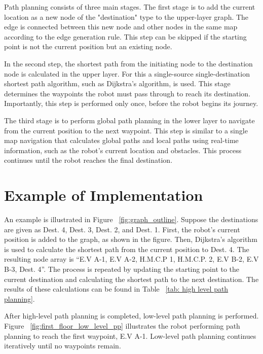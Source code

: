 \documentclass[en]{snu-cse-bsc-thesis}
\begin{document}
Path planning consists of three main stages. 
The first stage is to add the current location as a new node of the "destination" type to the upper-layer graph. 
The edge is connected between this new node and other nodes in the same map according to the edge generation rule.
This step can be skipped if the starting point is not the current position but an existing node.

In the second step, the shortest path from the initiating node to the destination node is calculated in the upper layer.
For this a single-source single-destination shortest path algorithm, such as Dijkstra’s algorithm, is used.
This stage determines the waypoints the robot must pass through to reach its destination. 
Importantly, this step is performed only once, before the robot begins its journey.

The third stage is to perform global path planning in the lower layer to navigate from the current position to the next waypoint. 
This step is similar to a single map navigation that calculates global paths and local paths using real-time information, such as the robot's current location and obstacles. 
This process continues until the robot reaches the final destination.

\section{Example of Implementation}\label{sec:Example}
An example is illustrated in Figure ~\ref{fig:graph_outline}. Suppose the destinations are given as Dest. 4, Dest. 3, Dest. 2, and Dest. 1. First, the robot's current position is added to the graph, as shown in the figure. Then, Dijkstra’s algorithm is used to calculate the shortest path from the current position to Dest. 4. The resulting node array is “E.V A-1, E.V A-2, H.M.C.P 1, H.M.C.P. 2, E.V B-2, E.V B-3, Dest. 4”. The process is repeated by updating the starting point to the current destination and calculating the shortest path to the next destination. The results of these calculations can be found in Table ~\ref{tab: high level path planning}.

After high-level path planning is completed, low-level path planning is performed. Figure ~\ref{fig:first_floor_low_level_pp} illustrates the robot performing path planning to reach the first waypoint, E.V A-1. Low-level path planning continues iteratively until no waypoints remain.
\end{document}
